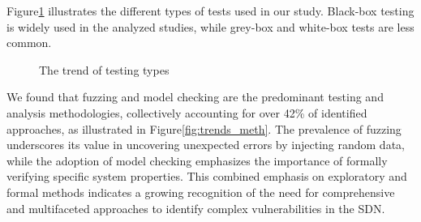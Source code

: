 Figure\ref{fig:trends_type} illustrates the different types of tests used in our study. Black-box testing is widely used in the analyzed studies, while grey-box and white-box tests are less common.

\begin{figure}[ht!]
    \centering
    \begin{adjustbox}{width=\linewidth,center}
        \end{adjustbox}
    \caption{The trend of testing types}
    \label{fig:trends_type}
\end{figure}

We found that fuzzing and model checking are the predominant testing and analysis methodologies, collectively accounting for over 42\% of identified approaches, as illustrated in Figure\ref{fig:trends_meth}. The prevalence of fuzzing underscores its value in uncovering unexpected errors by injecting random data, while the adoption of model checking emphasizes the importance of formally verifying specific system properties. This combined emphasis on exploratory and formal methods indicates a growing recognition of the need for comprehensive and multifaceted approaches to identify complex vulnerabilities in the SDN.

